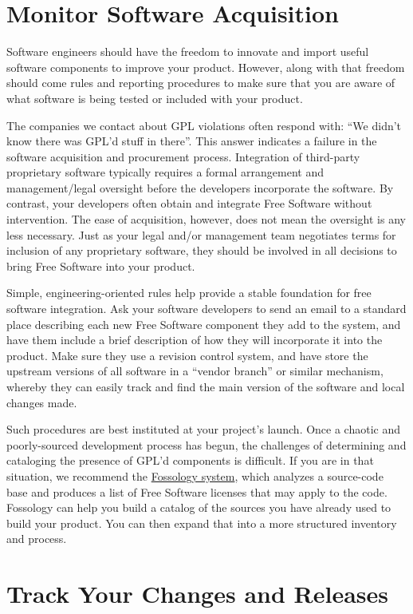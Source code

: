 \section{Monitor Software Acquisition}

Software engineers should have the freedom to innovate and import useful
software components to improve your product.  However, along with that
freedom should come rules and reporting procedures to make sure that you
are aware of what software is being tested or included with your product.

The companies we contact about GPL violations often respond with: ``We
didn't know there was GPL'd stuff in there''.  This answer indicates a
failure in the software acquisition and procurement process.  Integration
of third-party proprietary software typically requires a formal
arrangement and management/legal oversight before the developers
incorporate the software.  By contrast, your developers often obtain and
integrate Free Software without intervention. The ease of acquisition, however,
does not mean the oversight is any less necessary.  Just as your legal
and/or management team negotiates terms for inclusion of any proprietary
software, they should be involved in all decisions to bring Free Software into your
product.

Simple, engineering-oriented rules help provide a stable foundation for
free software integration.  Ask your software developers to send an email to a
standard place describing each new Free Software component they add to the system,
and have them include a brief description of how they will incorporate it
into the product.  Make sure they use a revision control system, and have
store the upstream versions of all software in a ``vendor branch'' or
similar mechanism, whereby they can easily track and find the main version
of the software and local changes made.

Such procedures are best instituted at your project's launch.  Once a
chaotic and poorly-sourced development process has begun, the challenges
of determining and cataloging the presence of GPL'd components is
difficult.  If you are in that situation, we recommend the
\href{http://fossology.org/}{Fossology system}, which analyzes a
source-code base and produces a list of Free Software licenses that may apply to
the code.  Fossology can help you build a catalog of the sources you have
already used to build your product.  You can then expand that into a more
structured inventory and process.

\section{Track Your Changes and Releases}

